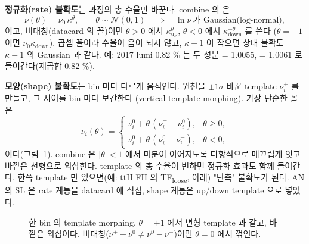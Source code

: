 \textbf{정규화(rate) 불확도}는 과정의 총 수율만 바꾼다. combine 의  은
\begin{equation}
  \nu(\theta)=\nu_0\,\kappa^{\theta},\qquad \theta\sim\mathcal{N}(0,1)
  \quad\Longrightarrow\quad \ln\nu\ \text{가 Gaussian(log-normal)},
  \label{eq:syst-lnN}
\end{equation}
이고, 비대칭(datacard 의  꼴)이면 $\theta>0$ 에서 $\kappa_{\mathrm{up}}^{\theta}$, $\theta<0$ 에서 $\kappa_{\mathrm{down}}^{-\theta}$ 를 쓴다
($\theta=-1$ 이면 $\nu_0\kappa_{\mathrm{down}}$). 곱셈 꼴이라 수율이 음이 되지 않고, $\kappa-1$ 이
작으면 상대 불확도 $\kappa-1$ 의 Gaussian 과 같다. 예: 2017 lumi 0.82 \% 는 두 성분  = 1.0055,
 = 1.0061 로 들어간다(제곱합 0.82 \%).

\textbf{모양(shape) 불확도}는 bin 마다 다르게 움직인다. 원천을 $\pm1\sigma$ 바꾼 template $\nu_i^{\pm}$ 를 만들고, 그 사이를 bin 마다 보간한다
(vertical template morphing). 가장 단순한 꼴은
\begin{equation}
  \nu_i(\theta)=
  \begin{cases}
    \nu_i^0+\theta\,(\nu_i^{+}-\nu_i^{0}), & \theta\ge0,\\
    \nu_i^0+\theta\,(\nu_i^{0}-\nu_i^{-}), & \theta<0,
  \end{cases}
  \label{eq:syst-morph}
\end{equation}
이다(그림~\ref{fig:syst-morph}). combine 은 $|\theta|<1$ 에서 미분이 이어지도록 다항식으로 매끄럽게 잇고 바깥은 선형으로 외삽한다. template 의
총 수율이 변하면 정규화 효과도 함께 들어간다. 한쪽 template 만 있으면(예: ttH FH 의 TF\textsubscript{loose}, 아래) "단측" 불확도가 된다.
AN 의 SL 은 rate 계통을 datacard 에 직접, shape 계통은 up/down template 으로 넣었다.

\begin{figure}[htbp]
\centering
{}
\caption{한 bin 의 template morphing. $\theta=\pm1$ 에서 변형 template 과 같고, 바깥은 외삽이다. 비대칭($\nu^+-\nu^0\ne\nu^0-\nu^-$)이면 $\theta=0$ 에서 꺾인다.}
\label{fig:syst-morph}
\end{figure}

